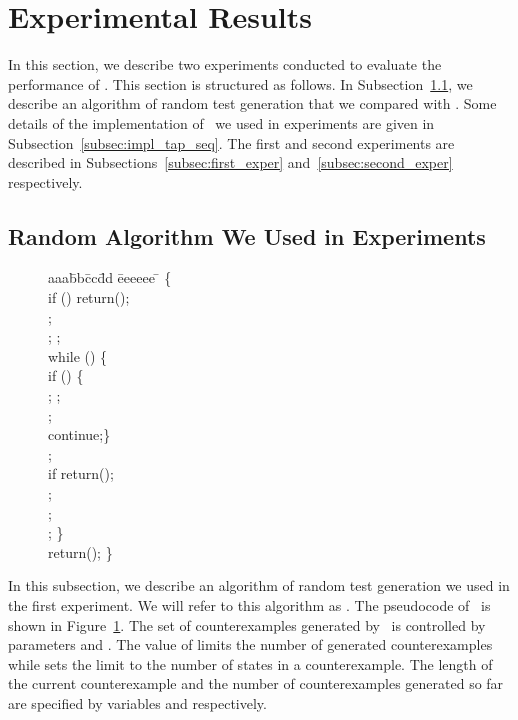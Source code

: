 \section{Experimental Results}
\label{sec:experiments}

In this  section, we describe two experiments  conducted to  evaluate the performance of \TS.
This section is structured as follows. In Subsection~\ref{subsec:rand_alg}, we describe an
 algorithm of random test generation that we compared with \TS. Some details of the implementation of \TS~we used
in experiments are given in Subsection~\ref{subsec:impl_tap_seq}. The first and second experiments
are described in Subsections~\ref{subsec:first_exper} and~\ref{subsec:second_exper} respectively.
\subsection{Random Algorithm We Used in Experiments}
\label{subsec:rand_alg}

\setlength{\intextsep}{10pt}
\setlength{\textfloatsep}{10pt}
\begin{figure}
\small
\begin{tabbing}
aaa\=bb\=cc\= dd \= eeeeee \= \kill
\Rnd\{\\
\> if () return(); \\
\> ; \\
 \> ; ; \\
 \> while () \{\\
 \Tt if () \{ \\
 \ttt  ; ; \\
 \ttt ; \\
 \ttt continue;\} \\
\Tt;\\
 \Tt if  return(); \\
 \Tt ; \\
\Tt ; \\
\Tt ; \} \\
 \> return(); \} \\
\end{tabbing} 
\vspace{-10pt}
\caption{}
\label{fig:rand_alg}
\end{figure}
 In this  subsection, we describe an algorithm of random test generation we used in the first experiment.
We will refer to this algorithm as \Rnd. 
The pseudocode of \Rnd~is shown in Figure~\ref{fig:rand_alg}.
The set of counterexamples generated by \Rnd~is controlled
by parameters  and . The value of  limits the number
of generated  counterexamples while  sets the limit to the number of states
in a counterexample. The length of the current counterexample and the number of counterexamples 
generated so far are specified by variables  and  respectively.

